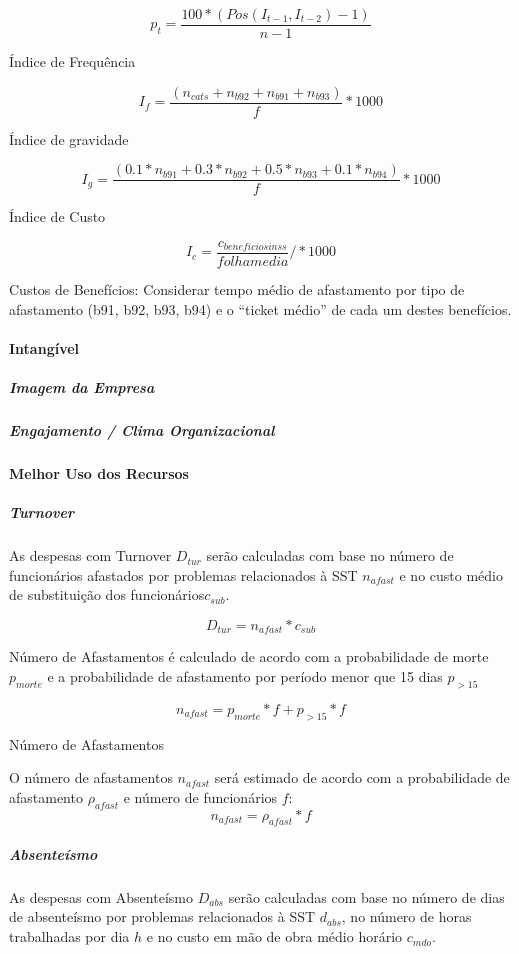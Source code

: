\documentclass[]{article}
\let\oldparagraph\paragraph
\renewcommand{\paragraph}[1]{\oldparagraph{#1}\mbox{}}
\let\oldsubparagraph\subparagraph
\renewcommand{\subparagraph}[1]{\oldsubparagraph{#1}\mbox{}}
\begin{document}
\[p_t = \frac{100*(Pos(I_{t-1},I_{t-2})-1)}{n-1}\]

Índice de Frequência

\[I_f = \frac{(n_{cats}+n_{b92}+n_{b91}+n_{b93})}{f} * 1000\]

Índice de gravidade

\[I_g = \frac{(0.1*n_{b91}+0.3*n_{b92}+0.5*n_{b93}+0.1*n_{b94})}{f}* 1000\]

Índice de Custo

\[I_c = \frac{c_{beneficios inss}}{folha media}/ * 1000\]

Custos de Benefícios: Considerar tempo médio de afastamento por tipo de
afastamento (b91, b92, b93, b94) e o ``ticket médio'' de cada um destes
benefícios.

\paragraph{Intangível}\label{intangivel}

\subparagraph{Imagem da Empresa}\label{imagem-da-empresa}

\subparagraph{Engajamento / Clima
Organizacional}\label{engajamento-clima-organizacional}

\paragraph{Melhor Uso dos Recursos}\label{melhor-uso-dos-recursos}

\subparagraph{Turnover}\label{turnover}

As despesas com Turnover \(D_{tur}\) serão calculadas com base no número
de funcionários afastados por problemas relacionados à SST \(n_{afast}\)
e no custo médio de substituição dos funcionários\(c_{sub}\).

\[D_{tur} = n_{afast} * c_{sub}\]

Número de Afastamentos é calculado de acordo com a probabilidade de
morte \(p_{morte}\) e a probabilidade de afastamento por período menor
que 15 dias \(p_{>15}\)

\[n_{afast} = p_{morte}*f + p_{>15}*f\]

Número de Afastamentos

O número de afastamentos \(n_{afast}\) será estimado de acordo com a
probabilidade de afastamento \(\rho_{afast}\) e número de funcionários
\(f\): \[n_{afast} = \rho_{afast} * f \]

\subparagraph{Absenteísmo}\label{absenteismo}

As despesas com Absenteísmo \(D_{abs}\) serão calculadas com base no
número de dias de absenteísmo por problemas relacionados à SST
\(d_{abs}\), no número de horas trabalhadas por dia \(h\) e no custo em
mão de obra médio horário \(c_{mdo}\).
\end{document}
